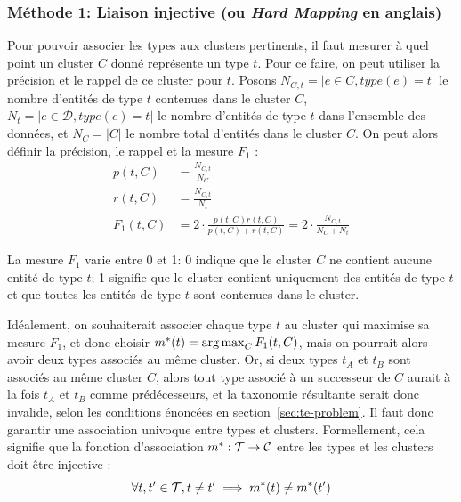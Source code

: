 \subsubsection{Méthode 1: Liaison injective (ou \textit{Hard Mapping} en anglais)}
\label{ssubsec:te-hardmapping}

Pour pouvoir associer les types aux clusters pertinents, il faut mesurer à quel point un cluster $C$ donné représente un type $t$. Pour ce faire, on peut utiliser la précision et le rappel de ce cluster pour $t$. Posons $N_{C,t} = | e \in C, type(e) = t|$ le nombre d'entités de type $t$ contenues dans le cluster $C$,
$N_t = |e \in \mathcal{D}, type(e) = t|$ le nombre d'entités de type $t$ dans l'ensemble des données, et $N_C = | C |$ le nombre total d'entités dans le cluster $C$. On peut alors définir la précision, le rappel et la mesure $F_1$ :
\begin{align}
    p(t, C) &= \frac{N_{C, t}}{N_C} \\
    r(t, C) &= \frac{N_{C, t}}{N_t} \\
    F_1(t, C) &= 2 \cdot \frac{p(t, C)r(t, C)}{p(t, C) + r(t, C)} = 2 \cdot \frac{N_{C,t}}{N_C + N_t}
\end{align}

La mesure $F_1$ varie entre 0 et 1: 0 indique que le cluster $C$ ne contient aucune entité de type $t$; 1 signifie que le cluster contient uniquement des entités de type $t$ et que toutes les entités de type $t$ sont contenues dans le cluster. 


Idéalement, on souhaiterait associer chaque type $t$ au cluster qui maximise sa mesure $F_1$, et donc choisir $m^*(t) = \operatorname*{arg\,max}_C F_1(t, C)$, mais on pourrait alors avoir deux types associés au même cluster. Or, si deux types $t_A$ et $t_B$ sont associés au même cluster $C$, alors tout type associé à un successeur de $C$ aurait à la fois $t_A$ et $t_B$ comme prédécesseurs, et la taxonomie résultante serait donc invalide, selon les conditions énoncées en section~\ref{sec:te-problem}. Il faut donc garantir une association univoque entre types et clusters. Formellement, cela signifie que la fonction d'association $m^* : \mathcal{T} \rightarrow \mathcal{C}$ entre les types et les clusters doit être injective :
\begin{equation}
    \forall t, t' \in \mathcal{T}, t \neq t' \implies m^*(t) \neq m^*(t')
\end{equation}


